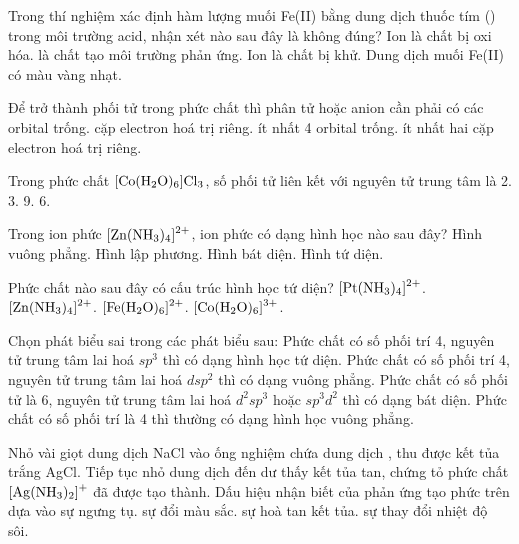 \documentclass[11pt,a4paper]{article}
\def\loigiai#1{}
\begin{document}
\begin{ex}
 Trong thí nghiệm xác định hàm lượng muối Fe(II) bằng dung dịch thuốc tím () trong môi trường acid, nhận xét nào sau đây là không đúng?
\choice
{Ion  là chất bị oxi hóa.}
{ là chất tạo môi trường phản ứng.}
{Ion  là chất bị khử.}
{Dung dịch muối Fe(II) có màu vàng nhạt.}
\loigiai{}
\end{ex}

\begin{ex}
Để trở thành phối tử trong phức chất thì phân tử hoặc anion cần phải có
\choice
{các orbital trống.}
{cặp electron hoá trị riêng.}
{ít nhất 4 orbital trống.}
{ít nhất hai cặp electron hoá trị riêng.}
\loigiai{}
\end{ex}

\begin{ex}
Trong phức chất $\ce{[Co(H2O)6]Cl3}$, số phối tử liên kết với nguyên tử trung tâm là
\choice
{2.}
{3.}
{9.}
{6.}
\loigiai{}
\end{ex}

\begin{ex}
Trong ion phức $\ce{[Zn(NH3)4]^2+}$, ion phức có dạng hình học nào sau đây?
\choice
{Hình vuông phẳng.}
{Hình lập phương.}
{Hình bát diện.}
{Hình tứ diện.}
\loigiai{}
\end{ex}

\begin{ex}
Phức chất nào sau đây có cấu trúc hình học tứ diện?
\choice
{$\ce{[Pt(NH3)4]^2+}$.}
{$\ce{[Zn(NH3)4]^2+}$.}
{$\ce{[Fe(H2O)6]^2+}$.}
{$\ce{[Co(H2O)6]^3+}$.}
\loigiai{}
\end{ex}

\begin{ex}
Chọn phát biểu sai trong các phát biểu sau:
\choice
{Phức chất có số phối trí 4, nguyên tử trung tâm lai hoá $sp^3$ thì có dạng hình học tứ diện.}
{Phức chất có số phối trí 4, nguyên tử trung tâm lai hoá $dsp^2$ thì có dạng vuông phẳng.}
{Phức chất có số phối tử là 6, nguyên tử trung tâm lai hoá $d^2sp^3$ hoặc $sp^3d^2$ thì có dạng bát diện.}
{Phức chất có số phối trí là 4 thì thường có dạng hình học vuông phẳng.}
\loigiai{}
\end{ex}

\newpage

\begin{ex}
Nhỏ vài giọt dung dịch NaCl vào ống nghiệm chứa dung dịch , thu được kết tủa trắng AgCl. Tiếp tục nhỏ dung dịch  đến dư thấy kết tủa tan, chứng tỏ phức chất $\ce{[Ag(NH3)2]+}$ đã được tạo thành. Dấu hiệu nhận biết của phản ứng tạo phức trên dựa vào
\choice
{sự ngưng tụ.}
{sự đổi màu sắc.}
{sự hoà tan kết tủa.}
{sự thay đổi nhiệt độ sôi.}
\loigiai{}
\end{ex}
\end{document}
